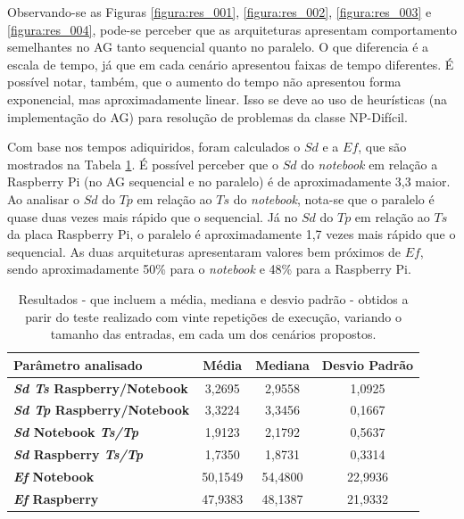 Observando-se as Figuras \ref{figura:res_001}, \ref{figura:res_002}, \ref{figura:res_003} e \ref{figura:res_004}, pode-se perceber que as arquiteturas apresentam comportamento semelhantes no AG tanto  sequencial quanto no paralelo. O que diferencia é a escala de tempo, já que em cada cenário apresentou faixas de tempo diferentes. É possível notar, também, que o aumento do tempo não apresentou forma exponencial, mas aproximadamente linear. Isso se deve ao uso de heurísticas (na implementação do AG) para resolução de problemas da classe NP-Difícil.

Com base nos tempos adiquiridos, foram calculados o $Sd$ e a $Ef$, que são mostrados na Tabela \ref{tabela:mostragem20}. É possível perceber que o $Sd$ do \textit{notebook} em relação a Raspberry Pi (no AG sequencial e no paralelo) é de aproximadamente 3,3 maior. Ao analisar o $Sd$ do $Tp$ em relação ao $Ts$ do \textit{notebook}, nota-se que o paralelo é quase duas vezes mais rápido que o sequencial. Já no $Sd$ do $Tp$ em relação ao $Ts$ da placa Raspberry Pi, o paralelo é aproximadamente 1,7 vezes mais rápido que o sequencial. As duas arquiteturas apresentaram valores bem próximos de $Ef$, sendo aproximadamente 50\% para o \textit{notebook} e 48\% para a Raspberry Pi.

\begin{table}[htb] \centering
	\caption{Resultados - que incluem a média, mediana e desvio padrão - obtidos a parir do teste realizado com vinte repetições de execução, variando o tamanho das entradas, em cada um dos cenários propostos.} \label{tabela:mostragem20}
	\begin{tabular}{l|ccc}        \hline
		\textbf{Parâmetro analisado} & \textbf{Média} & \textbf{Mediana} & \textbf{Desvio Padrão} \\ \hline \hline		
		\textbf{\textit{Sd Ts} Raspberry/Notebook} 	& 3,2695	& 2,9558 & 1,0925	\\
		\textbf{\textit{Sd Tp} Raspberry/Notebook} 	& 3,3224	& 3,3456 & 0,1667	\\
		\textbf{\textit{Sd} Notebook \textit{Ts/Tp}}		 	& 1,9123	& 2,1792 & 0,5637	\\
		\textbf{\textit{Sd} Raspberry \textit{Ts/Tp}}		 	& 1,7350	& 1,8731 & 0,3314	\\
		\textbf{\textit{Ef} Notebook}			 	& 50,1549	& 54,4800 & 22,9936	\\
		\textbf{\textit{Ef} Raspberry}			 	& 47,9383	& 48,1387 & 21,9332	\\ \hline
	\end{tabular}
\end{table}

